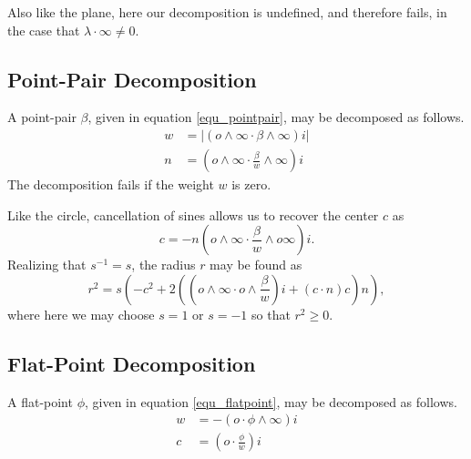 \documentclass[12pt]{article}
\newcommand{\nvao}{o}
\newcommand{\nvai}{\infty}
\begin{document}
Also like the plane, here our decomposition is undefined,
and therefore fails, in the case that $\lambda\cdot\nvai\neq 0$.

\subsection{Point-Pair Decomposition}

A point-pair $\beta$, given in equation \eqref{equ_pointpair}, may be
decomposed as follows.
\begin{align}
w &= |(\nvao\wedge\nvai\cdot\beta\wedge\nvai)i| \\
n &= \left(\nvao\wedge\nvai\cdot\frac{\beta}{w}\wedge\nvai\right)i
\end{align}
The decomposition fails if the weight $w$ is zero.

Like the circle, cancellation of sines allows us to recover the center $c$ as
\begin{equation}
c = -n\left(\nvao\wedge\nvai\cdot\frac{\beta}{w}\wedge\nvao\nvai\right)i.
\end{equation}
Realizing that $s^{-1}=s$, the radius $r$ may be found as
\begin{equation}
r^2 = s\left(-c^2 + 2\left(\left(\nvao\wedge\nvai\cdot\nvao\wedge\frac{\beta}{w}\right)i+(c\cdot n)c\right)n\right),
\end{equation}
where here we may choose $s=1$ or $s=-1$ so that $r^2\geq 0$.

\subsection{Flat-Point Decomposition}

A flat-point $\phi$, given in equation \eqref{equ_flatpoint}, may be decomposed as follows.
\begin{align}
w &= -(\nvao\cdot\phi\wedge\nvai)i \\
c &= \left(\nvao\cdot\frac{\phi}{w}\right)i
\end{align}
\end{document}
